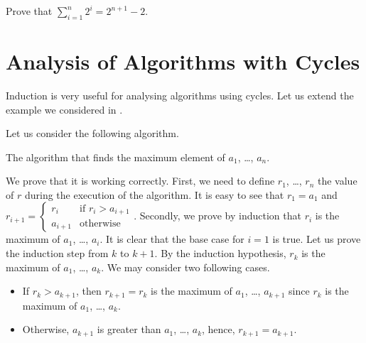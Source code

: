 \begin{exercise}
  Prove that $\sum_{i = 1}^n 2^i = 2^{n + 1} - 2$.
\end{exercise}

\section{Analysis of Algorithms with Cycles}

Induction is very useful for analysing algorithms using cycles. Let us extend
the example we considered in .

Let us consider the following algorithm.
\begin{algorithm}
  \begin{algorithmic}[1]
        \EndIf
      \EndFor
      \State{}
    \EndFunction
  \end{algorithmic}
  \caption{The algorithm that finds the maximum element of $a_1$, \dots, $a_n$.}
\end{algorithm}
We prove that it is working correctly. First, we need to define $r_1$,
\dots, $r_n$ the value of $r$ during the execution of the algorithm.
It is easy to see that $r_1 = a_1$ and
$
  r_{i + 1} =
  \begin{cases}
    r_i & \text{if } r_i > a_{i + 1} \\
    a_{i + 1} & \text{otherwise}
  \end{cases}
$.
Secondly, we prove by induction that $r_i$ is the maximum of $a_1$, \dots,
$a_i$. It is clear that the base case for $i = 1$ is true. Let us prove the
induction step from $k$ to $k + 1$. By the induction hypothesis, $r_k$
is the maximum of $a_1$, \dots, $a_k$. We may consider two following cases.
\begin{itemize}
  \item If $r_k > a_{k + 1}$, then $r_{k + 1} = r_{k}$ is the maximum of $a_1$,
    \dots, $a_{k + 1}$ since $r_k$ is the maximum of $a_1$, \dots, $a_k$.
  \item Otherwise, $a_{k + 1}$ is greater than $a_1$, \dots, $a_k$, hence,
    $r_{k + 1} = a_{k + 1}$.
\end{itemize}


